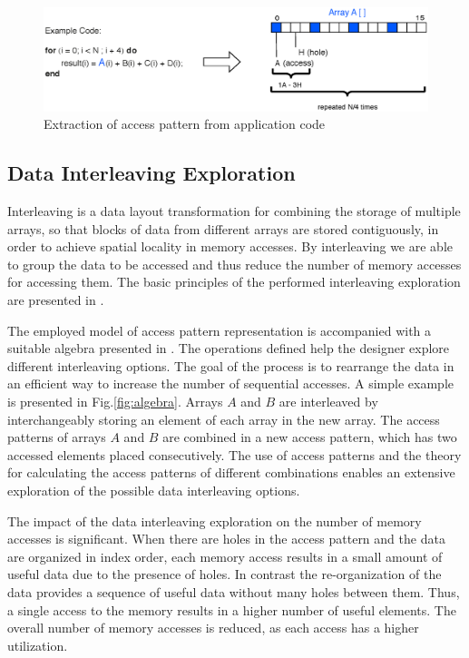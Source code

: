 \documentclass[prodmode,acmtecs]{acmsmall}
\begin{document}
\begin{figure}
\centering
	\includegraphics[scale = 0.6]{Images/AHpattern.eps} 
	\caption{Extraction of access pattern from application code}
	\label{fig:pattern}
\end{figure}


\subsection{Data Interleaving Exploration}
Interleaving is a data layout transformation for combining the storage of multiple arrays, so that blocks of data from different arrays are stored contiguously, in order to achieve spatial locality in memory accesses.
By interleaving we are able to group the data to be accessed and thus reduce the number of memory accesses for accessing them.
The basic principles of the performed interleaving exploration are presented in \cite{sharma2013data}.

The employed model of access pattern representation is accompanied with a suitable algebra presented in \cite{kritikakou2013phd}.
The operations defined help the designer explore different interleaving options.
The goal of the process is to rearrange the data in an efficient way to increase the number of sequential accesses.
A simple example is presented in Fig.\ref{fig:algebra}.
Arrays $A$ and $B$ are interleaved by interchangeably storing an element of each array in the new array. 
The access patterns of arrays $A$ and $B$ are combined in a new access pattern, which has two accessed elements placed consecutively.
The use of access patterns and the theory for calculating the access patterns of different combinations enables an extensive exploration of the possible data interleaving options.

The impact of the data interleaving exploration on the number of memory accesses is significant.
When there are holes in the access pattern and the data are organized in index order, each memory access results in a small amount of useful data due to the presence of holes.
In contrast the re-organization of the data provides a sequence of useful data without many holes between them.
Thus, a single access to the memory results in a higher number of useful elements.
The overall number of memory accesses is reduced, as each access has a higher utilization.
\end{document}
